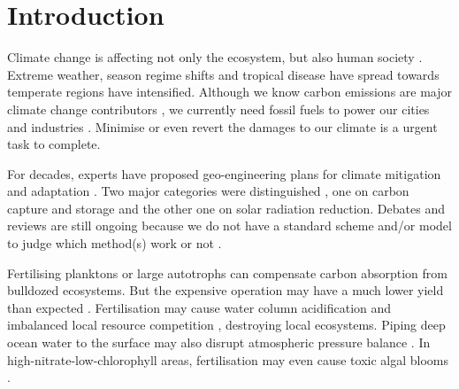 \documentclass[../thesis.tex]{subfiles} %
\begin{document}
\section{Introduction}

Climate change is affecting not only the ecosystem, but also human society \autocite{notz2016observed,schuur2015climate}.  Extreme weather, season regime shifts and tropical disease have spread towards temperate regions have intensified.  Although we know carbon emissions are major climate change contributors \autocite{notz2016observed}, we currently need fossil fuels to power our cities and industries \autocite{ferguson2000electricity}.  Minimise or even revert the damages to our climate is a urgent task to complete.

For decades, experts have proposed geo-engineering plans for climate mitigation and adaptation \autocite{farrelly2013carbon,yang2008progress,boyd2008ranking,boettcher2019high,vaughan2011review}.  Two major categories were distinguished \autocite{boyd2008ranking}, one on carbon capture and storage and the other one on solar radiation reduction.  Debates and reviews are still ongoing because we do not have a standard scheme and/or model to judge which method(s) work or not \autocite{boyd2008ranking,boettcher2019high,boyd2016development,oschlies2017indicators,gattuso2018ocean}.

Fertilising planktons \autocite{gnanadesikan2008export,lovelock2007ocean,lawrence2014efficiency} or large autotrophs \autocite{duarte2017can,johannessen2016geoengineering,krause2016substantial} can compensate carbon absorption from bulldozed ecosystems.  But the expensive operation may have a much lower yield than expected \autocite{boyd2008implications,gnanadesikan2008export,oschlies2010side}.  Fertilisation may cause water column acidification \autocite{oschlies2010side} and imbalanced local resource competition \autocite{chung2011using,thiele2012microbial,batten2014did}, destroying local ecosystems.  Piping deep ocean water to the surface may also disrupt atmospheric pressure balance \autocite{kwiatkowski2015atmospheric}.  In high-nitrate-low-chlorophyll areas, fertilisation may even cause toxic algal blooms \autocite{trick2010iron}.
\end{document}
